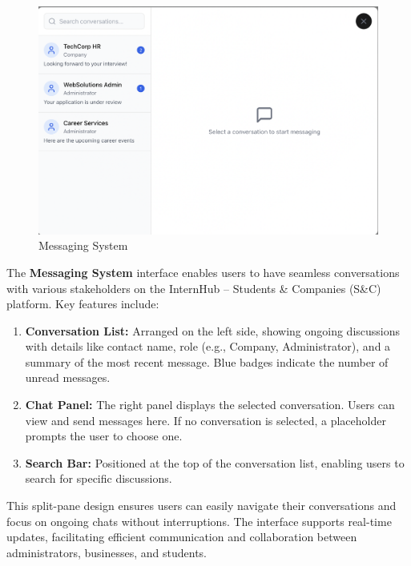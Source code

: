 \begin{figure}[H]
    \begin{center}
        \includegraphics[width=0.82\linewidth]{JhaBhatiaSharma/imagesDD/MessagingSystem.png}
        \caption{Messaging System}
        \label{fig:messagingSystme}
    \end{center}
\end{figure}

The \textbf{Messaging System} interface enables users to have seamless conversations with various stakeholders on the InternHub – Students \& Companies (S\&C) platform. Key features include:
\begin{enumerate}
    \item \textbf{Conversation List:} Arranged on the left side, showing ongoing discussions with details like contact name, role (e.g., Company, Administrator), and a summary of the most recent message. Blue badges indicate the number of unread messages.
    \item \textbf{Chat Panel:} The right panel displays the selected conversation. Users can view and send messages here. If no conversation is selected, a placeholder prompts the user to choose one.
    \item \textbf{Search Bar:} Positioned at the top of the conversation list, enabling users to search for specific discussions.
\end{enumerate}

This split-pane design ensures users can easily navigate their conversations and focus on ongoing chats without interruptions. The interface supports real-time updates, facilitating efficient communication and collaboration between administrators, businesses, and students.

